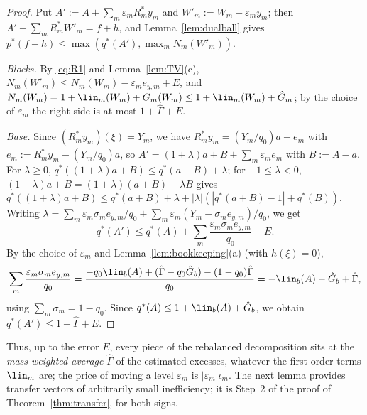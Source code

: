 \begin{proof}
Put $A':=A+\sum_m\varepsilon_mR_m^*y_m$ and $W'_m:=W_m-\varepsilon_my_m$; then
$A'+\sum_mR_m^*W'_m=f+h$, and Lemma~\ref{lem:dualball} gives
$p^*(f+h)\le\max(q^*(A'),\max_mN_m(W'_m))$.

\emph{Blocks.}  By \eqref{eq:R1} and Lemma~\ref{lem:TV}(c),
$N_m(W'_m)\le N_m(W_m)-\varepsilon_me_{y,m}+E$, and
$N_m(W_m)=1+\lin_m(W_m)+G_m(W_m)\le1+\lin_m(W_m)+\hat G_m$; by the choice of
$\varepsilon_m$ the right side is at most $1+\hat\Gamma+E$.

\emph{Base.}  Since $(R_m^*y_m)(\xi)=Y_m$, we have
$R_m^*y_m=(Y_m/q_0)a+e_m$ with $e_m:=R_m^*y_m-(Y_m/q_0)a$, so
$A'=(1+\lambda)a+B+\sum_m\varepsilon_me_m$ with $B:=A-a$.  For
$\lambda\ge0$, $q^*((1+\lambda)a+B)\le q^*(a+B)+\lambda$; for
$-1\le\lambda<0$, $(1+\lambda)a+B=(1+\lambda)(a+B)-\lambda B$ gives
$q^*((1+\lambda)a+B)\le q^*(a+B)+\lambda+|\lambda|(|q^*(a+B)-1|+q^*(B))$.
Writing $\lambda=\sum_m\varepsilon_m\sigma_me_{y,m}/q_0+\sum_m\varepsilon_m
(Y_m-\sigma_me_{y,m})/q_0$, we get
\[
 q^*(A')\le q^*(A)+\sum_m\frac{\varepsilon_m\sigma_me_{y,m}}{q_0}+E .
\]
By the choice of $\varepsilon_m$ and Lemma~\ref{lem:bookkeeping}(a) (with
$h(\xi)=0$),
\[
 \sum_m\frac{\varepsilon_m\sigma_me_{y,m}}{q_0}
 =\frac{-q_0\lin_b(A)+(\hat\Gamma-q_0\hat G_b)-(1-q_0)\hat\Gamma}{q_0}
 =-\lin_b(A)-\hat G_b+\hat\Gamma,
\]
using $\sum_m\sigma_m=1-q_0$.  Since $q^*(A)\le1+\lin_b(A)+\hat G_b$, we
obtain $q^*(A')\le1+\hat\Gamma+E$.
\end{proof}

Thus, up to the error $E$, every piece of the rebalanced decomposition sits
at the \emph{mass-weighted average} $\hat\Gamma$ of the estimated excesses,
whatever the first-order terms $\lin_m$ are; the price of moving a level
$\varepsilon_m$ is $|\varepsilon_m|\iota_m$.  The next lemma provides
transfer vectors of arbitrarily small inefficiency; it is
Step~2 of the proof of Theorem~\ref{thm:transfer}, for both signs.

